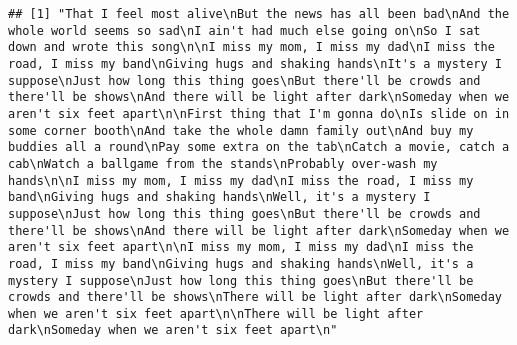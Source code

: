 \documentclass[]{article}
\begin{document}
\begin{verbatim}
## [1] "That I feel most alive\nBut the news has all been bad\nAnd the whole world seems so sad\nI ain't had much else going on\nSo I sat down and wrote this song\n\nI miss my mom, I miss my dad\nI miss the road, I miss my band\nGiving hugs and shaking hands\nIt's a mystery I suppose\nJust how long this thing goes\nBut there'll be crowds and there'll be shows\nAnd there will be light after dark\nSomeday when we aren't six feet apart\n\nFirst thing that I'm gonna do\nIs slide on in some corner booth\nAnd take the whole damn family out\nAnd buy my buddies all a round\nPay some extra on the tab\nCatch a movie, catch a cab\nWatch a ballgame from the stands\nProbably over-wash my hands\n\nI miss my mom, I miss my dad\nI miss the road, I miss my band\nGiving hugs and shaking hands\nWell, it's a mystery I suppose\nJust how long this thing goes\nBut there'll be crowds and there'll be shows\nAnd there will be light after dark\nSomeday when we aren't six feet apart\n\nI miss my mom, I miss my dad\nI miss the road, I miss my band\nGiving hugs and shaking hands\nWell, it's a mystery I suppose\nJust how long this thing goes\nBut there'll be crowds and there'll be shows\nThere will be light after dark\nSomeday when we aren't six feet apart\n\nThere will be light after dark\nSomeday when we aren't six feet apart\n"                                                                                                                                                                                                                                                                                                                                                                                             

\end{verbatim}
\end{document}
